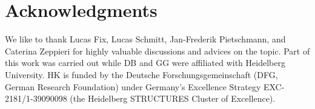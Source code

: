 \documentclass{article}
\numberwithin{figure}{section}
\numberwithin{equation}{section}
\begin{document}
\section*{Acknowledgments}
We like to thank Lucas Fix, Lucas Schmitt, Jan-Frederik Pietschmann, and Caterina Zeppieri for highly valuable discussions and advices on the topic. Part of this work was carried out while DB and GG were affiliated with Heidelberg University. HK is funded by the Deutsche Forschungsgemeinschaft (DFG, German Research Foundation) under Germany’s Excellence Strategy EXC-2181/1-39090098 (the Heidelberg STRUCTURES Cluster of Excellence).



\end{document}
